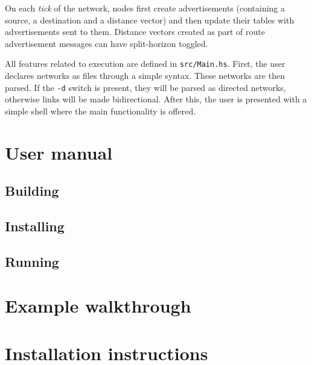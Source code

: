 \documentclass{scrartcl}
\begin{document}
On each \textit{tick} of the network, nodes first create advertisements
(containing a source, a destination and a distance vector) and then update their
tables with advertisements sent to them. Distance vectors created as part of
route advertisement messages can have split-horizon toggled.

All features related to execution are defined in \texttt{src/Main.hs}. First,
the user declares networks as files through a simple syntax. These networks are
then parsed. If the \texttt{-d} switch is present, they will be parsed as
directed networks, otherwise links will be made bidirectional. After this, the
user is presented with a simple shell where the main functionality is offered.

\section{User manual}
\subsection{Building}
\subsection{Installing}
\subsection{Running}

\section{Example walkthrough}

\section{Installation instructions}
\end{document}
